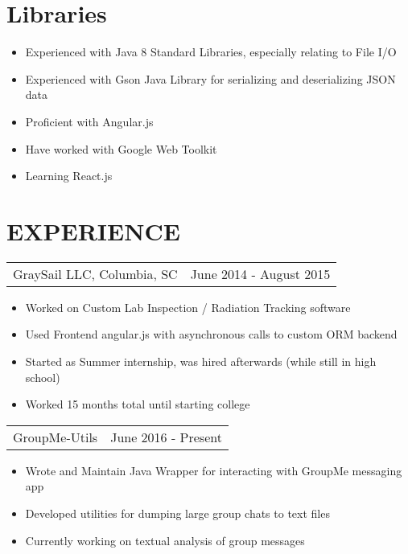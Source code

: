 \documentclass[margin]{res}
\begin{document}
\begin{resume}
\normalsize{\section{Libraries}}
    \begin{itemize} \itemsep -2pt
        \item Experienced with Java 8 Standard Libraries, especially relating to File I/O
        \item Experienced with Gson Java Library for serializing and deserializing JSON data
        \item Proficient with Angular.js
        \item Have worked with Google Web Toolkit
        \item Learning React.js
    \end{itemize}
 


\section{EXPERIENCE}      
    \begin{tabular}{p{3.5in} p{3in}} %
        GraySail LLC, Columbia, SC        & June 2014 - August 2015
    \end{tabular}
    \begin{itemize} \itemsep -2pt
        \item Worked on Custom Lab Inspection / Radiation Tracking software
        \item Used Frontend angular.js with asynchronous calls to custom ORM backend
        \item Started as Summer internship, was hired afterwards (while still in high school)
        \item Worked 15 months total until starting college
	\end{itemize}

    \begin{tabular}{p{3.5in} p{3in}}
        GroupMe-Utils & June 2016 - Present
    \end{tabular}
    \begin{itemize} \itemsep -2pt
        \item Wrote and Maintain Java Wrapper for interacting with GroupMe messaging app
        \item Developed utilities for dumping large group chats to text files
        \item Currently working on textual analysis of group messages
    \end{itemize}


\end{resume}
\end{document}
